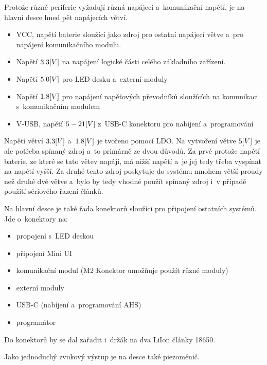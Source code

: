 Protože různé periferie vyžadují různá napájecí a~komunikační napětí, je na hlavní desce hned pět napájecích větví.
\begin{itemize}
    \item VCC, napětí baterie sloužící jako zdroj pro ostatní napájecí větve a~pro napájení komunikačního modulu. 
    \item Napětí \(3.3\-[V]\) na napájení logické části celého základního zařízení.
    \item Napětí \(5.0\-[V]\) pro LED desku a~externí moduly
    \item Napětí \(1.8\-[V]\) pro napájení napěťových převodníků sloužících na komunikaci s~komunikačním modulem 
    \item V-USB, napětí \(5\- - \-21\-[V]\) z~USB-C konektoru pro nabíjení a~programování
\end{itemize}
Napětí větví \(3.3\-[V]\) a~\(1.8\-[V]\) je tvořeno pomocí LDO.
Na vytvoření větve \(5\-[V]\) je ale potřeba spínaný zdroj a~to primárně ze dvou důvodů.
Za prvé protože napětí baterie, ze které se tato větev napájí, má nižší napětí a~je jej tedy třeba vyspínat na napětí vyšší.
Za druhé tento zdroj poskytuje do systému mnohem větší proudy než druhé dvě větve a~bylo by tedy vhodné použít spínaný zdroj i~v případě použití sériového řazení článků.

\newpage
Na hlavní desce je také řada konektorů sloužící pro připojení ostatních systémů.
Jde o~konektory na:
\begin{itemize}
    \item propojení s~LED deskou                                            %
    \item připojení Mini UI                                                 %
    \item komunikační modul (M2 Konektor umožňuje použít různé moduly)      %
    \item externí moduly                                                    %
    \item USB-C (nabíjení a~programování AHS)                               %
    \item programátor                                                       %
\end{itemize}
Do konektorů by se dal zařadit i~držák na dva LiIon články 18650.

Jako jednoduchý zvukový výstup je na desce také piezoměnič.

